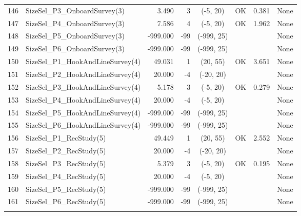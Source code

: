 \documentclass[12pt,]{article}
\begin{document}
\begin{landscape}
\begin{longtable}{rlrrcccl}
  146 & SizeSel\_P3\_OnboardSurvey(3) & 3.490 & 3 & (-5, 20) & OK & 0.381 & None \\ 
  147 & SizeSel\_P4\_OnboardSurvey(3) & 7.586 & 4 & (-5, 20) & OK & 1.962 & None \\ 
  148 & SizeSel\_P5\_OnboardSurvey(3) & -999.000 & -99 & (-999, 25) &  &  & None \\ 
  149 & SizeSel\_P6\_OnboardSurvey(3) & -999.000 & -99 & (-999, 25) &  &  & None \\ 
  150 & SizeSel\_P1\_HookAndLineSurvey(4) & 49.031 & 1 & (20, 55) & OK & 3.651 & None \\ 
  151 & SizeSel\_P2\_HookAndLineSurvey(4) & 20.000 & -4 & (-20, 20) &  &  & None \\ 
  152 & SizeSel\_P3\_HookAndLineSurvey(4) & 5.178 & 3 & (-5, 20) & OK & 0.279 & None \\ 
  153 & SizeSel\_P4\_HookAndLineSurvey(4) & 20.000 & -4 & (-5, 20) &  &  & None \\ 
  154 & SizeSel\_P5\_HookAndLineSurvey(4) & -999.000 & -99 & (-999, 25) &  &  & None \\ 
  155 & SizeSel\_P6\_HookAndLineSurvey(4) & -999.000 & -99 & (-999, 25) &  &  & None \\ 
  156 & SizeSel\_P1\_RecStudy(5) & 49.449 & 1 & (20, 55) & OK & 2.552 & None \\ 
  157 & SizeSel\_P2\_RecStudy(5) & 20.000 & -4 & (-20, 20) &  &  & None \\ 
  158 & SizeSel\_P3\_RecStudy(5) & 5.379 & 3 & (-5, 20) & OK & 0.195 & None \\ 
  159 & SizeSel\_P4\_RecStudy(5) & 20.000 & -4 & (-5, 20) &  &  & None \\ 
  160 & SizeSel\_P5\_RecStudy(5) & -999.000 & -99 & (-999, 25) &  &  & None \\ 
  161 & SizeSel\_P6\_RecStudy(5) & -999.000 & -99 & (-999, 25) &  &  & None \\ 
   \hline
\hline
\label{tab:Model2_params}
\end{longtable}
\end{landscape}

\newpage
\end{document}
